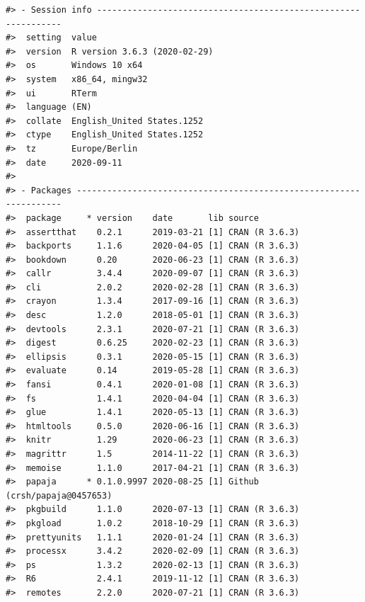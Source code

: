 \documentclass[
  english,
  doc,floatsintext,draftall]{apa6}
\begin{document}
\begin{verbatim}
#> - Session info ---------------------------------------------------------------
#>  setting  value                       
#>  version  R version 3.6.3 (2020-02-29)
#>  os       Windows 10 x64              
#>  system   x86_64, mingw32             
#>  ui       RTerm                       
#>  language (EN)                        
#>  collate  English_United States.1252  
#>  ctype    English_United States.1252  
#>  tz       Europe/Berlin               
#>  date     2020-09-11                  
#> 
#> - Packages -------------------------------------------------------------------
#>  package     * version    date       lib source                      
#>  assertthat    0.2.1      2019-03-21 [1] CRAN (R 3.6.3)              
#>  backports     1.1.6      2020-04-05 [1] CRAN (R 3.6.3)              
#>  bookdown      0.20       2020-06-23 [1] CRAN (R 3.6.3)              
#>  callr         3.4.4      2020-09-07 [1] CRAN (R 3.6.3)              
#>  cli           2.0.2      2020-02-28 [1] CRAN (R 3.6.3)              
#>  crayon        1.3.4      2017-09-16 [1] CRAN (R 3.6.3)              
#>  desc          1.2.0      2018-05-01 [1] CRAN (R 3.6.3)              
#>  devtools      2.3.1      2020-07-21 [1] CRAN (R 3.6.3)              
#>  digest        0.6.25     2020-02-23 [1] CRAN (R 3.6.3)              
#>  ellipsis      0.3.1      2020-05-15 [1] CRAN (R 3.6.3)              
#>  evaluate      0.14       2019-05-28 [1] CRAN (R 3.6.3)              
#>  fansi         0.4.1      2020-01-08 [1] CRAN (R 3.6.3)              
#>  fs            1.4.1      2020-04-04 [1] CRAN (R 3.6.3)              
#>  glue          1.4.1      2020-05-13 [1] CRAN (R 3.6.3)              
#>  htmltools     0.5.0      2020-06-16 [1] CRAN (R 3.6.3)              
#>  knitr         1.29       2020-06-23 [1] CRAN (R 3.6.3)              
#>  magrittr      1.5        2014-11-22 [1] CRAN (R 3.6.3)              
#>  memoise       1.1.0      2017-04-21 [1] CRAN (R 3.6.3)              
#>  papaja      * 0.1.0.9997 2020-08-25 [1] Github (crsh/papaja@0457653)
#>  pkgbuild      1.1.0      2020-07-13 [1] CRAN (R 3.6.3)              
#>  pkgload       1.0.2      2018-10-29 [1] CRAN (R 3.6.3)              
#>  prettyunits   1.1.1      2020-01-24 [1] CRAN (R 3.6.3)              
#>  processx      3.4.2      2020-02-09 [1] CRAN (R 3.6.3)              
#>  ps            1.3.2      2020-02-13 [1] CRAN (R 3.6.3)              
#>  R6            2.4.1      2019-11-12 [1] CRAN (R 3.6.3)              
#>  remotes       2.2.0      2020-07-21 [1] CRAN (R 3.6.3)              

\end{verbatim}
\end{document}
